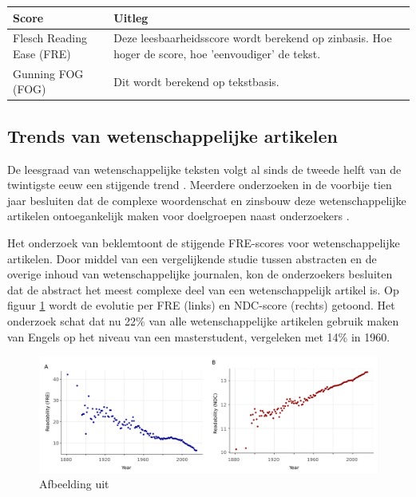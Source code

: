 \begin{center}
	\begin{tabular}{ | m{8cm} | m{8cm} | } 
		\hline
		\textbf{Score} & \textbf{Uitleg} \\ 
		\hline
		Flesch Reading Ease (FRE) & Deze leesbaarheidsscore wordt berekend op zinbasis. Hoe hoger de score, hoe 'eenvoudiger' de tekst. \\
		\hline
		Gunning FOG (FOG) & Dit wordt berekend op tekstbasis. \\
		\hline
	\end{tabular}
	\label{table:readability-scores}
\end{center}

\subsection{Trends van wetenschappelijke artikelen}

De leesgraad van wetenschappelijke teksten volgt al sinds de tweede helft van de twintigste eeuw een stijgende trend \autocite{Hayes1992}. Meerdere onderzoeken in de voorbije tien jaar besluiten dat de complexe woordenschat en zinsbouw deze wetenschappelijke artikelen ontoegankelijk maken voor doelgroepen naast onderzoekers \autocite{Ball2017, PlavenSigray2017, Jones2019}. 

\medspace

Het onderzoek van \textcite{PlavenSigray2017} beklemtoont de stijgende FRE-scores voor wetenschappelijke artikelen. Door middel van een vergelijkende studie tussen abstracten en de overige inhoud van wetenschappelijke journalen, kon de onderzoekers besluiten dat de abstract het meest complexe deel van een wetenschappelijk artikel is.  Op figuur \ref{img:fre-ndc} wordt de evolutie per FRE (links) en NDC-score (rechts) getoond. Het onderzoek schat dat nu 22\% van alle wetenschappelijke artikelen gebruik maken van Engels op het niveau van een masterstudent, vergeleken met 14\% in 1960. 

\begin{figure}[H]
	\includegraphics[width=\linewidth]{img/fre-ndc.png}
	\caption{Afbeelding uit \textcite{PlavenSigray2017}}
	\label{img:fre-ndc}
\end{figure}

